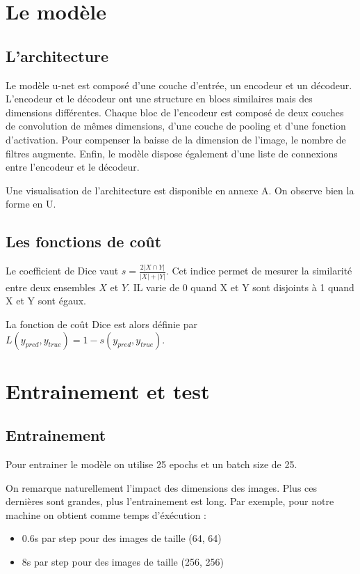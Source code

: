 \documentclass[12pt,a4paper,titlepage]{article}
\begin{document}
\section{Le modèle}

\subsection{L'architecture}

Le modèle u-net est composé d'une couche d'entrée, un encodeur et un décodeur.
L'encodeur et le décodeur ont une structure en blocs similaires mais des dimensions différentes.
Chaque bloc de l'encodeur est composé de deux couches de convolution de mêmes dimensions,
d'une couche de pooling et d'une fonction d'activation. Pour compenser la baisse de la
dimension de l'image, le nombre de filtres augmente. Enfin, le modèle dispose également d'une
liste de connexions entre l'encodeur et le décodeur.

Une visualisation de l'architecture est disponible en annexe A. On observe bien la forme en U.

\subsection{Les fonctions de coût}

Le coefficient de Dice vaut $s = \frac{2 \lvert X \cap Y \rvert}{\lvert X \rvert + \lvert Y \rvert}$.
Cet indice permet de mesurer la similarité entre deux ensembles $X$ et $Y$. IL varie de
0 quand X et Y sont disjoints à 1 quand X et Y sont égaux.

La fonction de coût Dice est alors définie par $L(y_{pred}, y_{true}) = 1 - s(y_{pred}, y_{true})$.

\section{Entrainement et test}

\subsection{Entrainement}

Pour entrainer le modèle on utilise 25 epochs et un batch size de 25.

On remarque naturellement l'impact des dimensions des images. Plus ces dernières sont
grandes, plus l'entrainement est long. Par exemple, pour notre machine on obtient comme temps
d'éxécution :

\begin{itemize}
    \item{0.6s par step pour des images de taille (64, 64)}
    \item{8s par step pour des images de taille (256, 256)}
\end{itemize}
\end{document}
